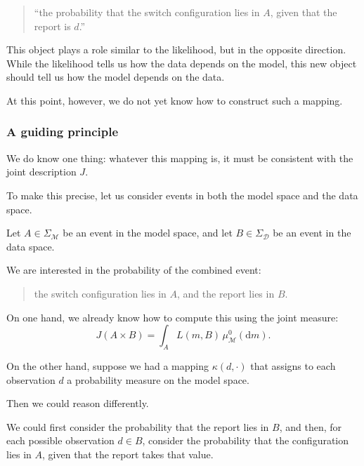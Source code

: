 \documentclass[11pt]{article}
\theoremstyle{remark}
\newcommand{\modelspace}{\mathcal{M}}
\newcommand{\dataspace}{\mathcal{D}}
\begin{document}
\begin{quote}
``the probability that the switch configuration lies in \(A\), given that the report is \(d\).''
\end{quote}

\vspace{2mm}

This object plays a role similar to the likelihood, but in the opposite direction. While the likelihood tells us how the data depends on the model, this new object should tell us how the model depends on the data.

\vspace{2mm}

At this point, however, we do not yet know how to construct such a mapping.

\vspace{2mm}

\subsubsection{A guiding principle}

We do know one thing: whatever this mapping is, it must be consistent with the joint description \(J\).

To make this precise, let us consider events in both the model space and the data space.

\vspace{2mm}

Let \(A \in \Sigma_{\modelspace}\) be an event in the model space, and let \(B \in \Sigma_{\dataspace}\) be an event in the data space.

We are interested in the probability of the combined event:
\begin{quote}
the switch configuration lies in \(A\), and the report lies in \(B\).
\end{quote}

\vspace{2mm}

On one hand, we already know how to compute this using the joint measure:
\[
J(A \times B)
=
\int_A L(m,B)\,\mu_{\modelspace}^0(\mathrm dm).
\]

\vspace{2mm}

On the other hand, suppose we had a mapping \(\kappa(d,\cdot)\) that assigns to each observation \(d\) a probability measure on the model space.

Then we could reason differently.

We could first consider the probability that the report lies in \(B\), and then, for each possible observation \(d \in B\), consider the probability that the configuration lies in \(A\), given that the report takes that value.
\end{document}
